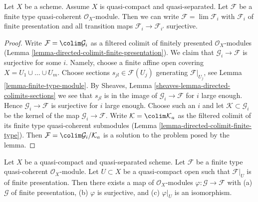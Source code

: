 \begin{lemma}
\label{lemma-finite-directed-colimit-surjective-maps}
Let $X$ be a scheme. Assume $X$ is quasi-compact and quasi-separated.
Let $\mathcal{F}$ be a finite type quasi-coherent $\mathcal{O}_X$-module.
Then we can write $\mathcal{F} = \lim \mathcal{F}_i$ with $\mathcal{F}_i$
of finite presentation and all transition maps
$\mathcal{F}_i \to \mathcal{F}_{i'}$ surjective.
\end{lemma}

\begin{proof}
Write $\mathcal{F} = \colim \mathcal{G}_i$ as a filtered colimit of
finitely presented $\mathcal{O}_X$-modules
(Lemma \ref{lemma-directed-colimit-finite-presentation}).
We claim that $\mathcal{G}_i \to \mathcal{F}$ is surjective for some $i$.
Namely, choose a finite affine open covering $X = U_1 \cup \ldots \cup U_m$.
Choose sections $s_{jl} \in \mathcal{F}(U_j)$ generating
$\mathcal{F}|_{U_j}$, see Lemma \ref{lemma-finite-type-module}.
By Sheaves, Lemma \ref{sheaves-lemma-directed-colimits-sections}
we see that $s_{jl}$ is in the image of $\mathcal{G}_i \to \mathcal{F}$
for $i$ large enough. Hence $\mathcal{G}_i \to \mathcal{F}$ is surjective
for $i$ large enough. Choose such an $i$ and let
$\mathcal{K} \subset \mathcal{G}_i$ be the kernel of the map
$\mathcal{G}_i \to \mathcal{F}$. Write $\mathcal{K} = \colim \mathcal{K}_a$
as the filtered colimit of its finite type quasi-coherent submodules
(Lemma \ref{lemma-directed-colimit-finite-type}). Then
$\mathcal{F} = \colim \mathcal{G}_i/\mathcal{K}_a$ is a solution
to the problem posed by the lemma.
\end{proof}

\begin{lemma}
\label{lemma-application-directed-colimit}
Let $X$ be a quasi-compact and quasi-separated scheme.
Let $\mathcal{F}$ be a finite type quasi-coherent $\mathcal{O}_X$-module.
Let $U \subset X$ be a quasi-compact open such that $\mathcal{F}|_U$
is of finite presentation. Then there exists a map of $\mathcal{O}_X$-modules
$\varphi : \mathcal{G} \to \mathcal{F}$ with
(a) $\mathcal{G}$ of finite presentation,
(b) $\varphi$ is surjective, and
(c) $\varphi|_U$ is an isomorphism.
\end{lemma}

